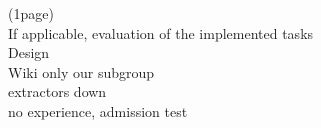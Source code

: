 (1page)\\
If applicable, evaluation of the implemented tasks \\
Design\\
Wiki only our subgroup\\
extractors down\\
no experience, admission test\\
